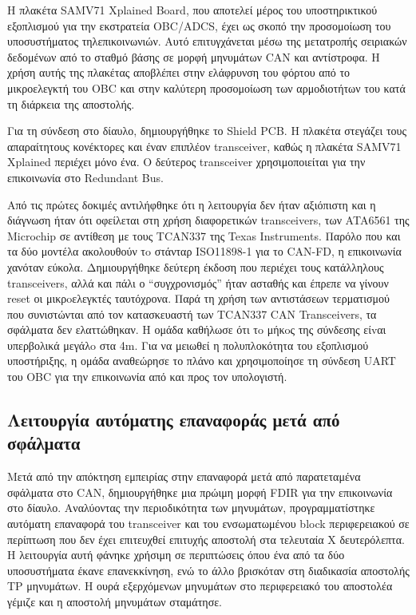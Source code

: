 \documentclass[a4paper,nobib,justified]{tufte-book}
\begin{document}
Η πλακέτα SAMV71 Xplained Board, που αποτελεί μέρος του υποστηρικτικού εξοπλισμού για την εκστρατεία OBC/ADCS, έχει ως σκοπό την προσομοίωση του υποσυστήματος τηλεπικοινωνιών. Αυτό επιτυγχάνεται μέσω της μετατροπής σειριακών δεδομένων από το σταθμό βάσης σε μορφή μηνυμάτων CAN και αντίστροφα. Η χρήση αυτής της πλακέτας αποβλέπει στην ελάφρυνση του φόρτου από το μικροελεγκτή του OBC και στην καλύτερη προσομοίωση των αρμοδιοτήτων του κατά τη διάρκεια της αποστολής.

Για τη σύνδεση στο δίαυλο, δημιουργήθηκε το Shield PCB. Η πλακέτα στεγάζει τους απαραίτητους κονέκτορες και έναν επιπλέον transceiver, καθώς η πλακέτα SAMV71 Xplained περιέχει μόνο ένα. Ο δεύτερος transceiver χρησιμοποιείται για την επικοινωνία στο Redundant Bus.

Από τις πρώτες δοκιμές αντιλήφθηκε ότι η λειτουργία δεν ήταν αξιόπιστη και η διάγνωση ήταν ότι οφείλεται στη χρήση διαφορετικών transceivers, των ATA6561 της Microchip σε αντίθεση με τους TCAN337 της Texas Instruments. Παρόλο που και τα δύο μοντέλα ακολουθούν τo στάνταρ ISO11898-1 για το CAN-FD, η επικοινωνία χανόταν εύκολα. Δημιουργήθηκε δεύτερη έκδοση που περιέχει τους κατάλληλους transceivers, αλλά και πάλι ο “συγχρονισμός” ήταν ασταθής και έπρεπε να γίνουν reset οι μικρoελεγκτές ταυτόχρονα. Παρά τη χρήση των αντιστάσεων τερματισμού που συνιστώνται από τον κατασκευαστή των TCAN337 CAN Transceivers, τα σφάλματα δεν ελαττώθηκαν. Η ομάδα καθήλωσε ότι τo μήκoς της σύνδεσης είvαι υπερβολικά μεγάλo στα 4m. Για να μειωθεί η πολυπλοκότητα του εξοπλισμού υποστήριξης, η ομάδα αναθεώρησε το πλάνο και χρησιμοποίησε τη σύνδεση UART του OBC για την επικοινωνία από και προς τον υπολογιστή.
\subsection{Λειτουργία αυτόματης επαναφοράς μετά από σφάλματα}
Μετά από την απόκτηση εμπειρίας στην επαναφορά μετά από παρατεταμένα σφάλματα στο CAN, δημιουργήθηκε μια πρώιμη μορφή FDIR για την επικοινωνία στο δίαυλο. Αναλύοντας την περιοδικότητα των μηνυμάτων, προγραμματίστηκε αυτόματη επαναφορά του transceiver και του ενσωματωμένου block περιφερειακού σε περίπτωση που δεν έχει επιτευχθεί επιτυχής αποστολή στα τελευταία X δευτερόλεπτα. Η λειτουργία αυτή φάνηκε χρήσιμη σε περιπτώσεις όπου ένα από τα δύο υποσυστήματα έκανε επανεκκίνηση, ενώ το άλλο βρισκόταν στη διαδικασία αποστολής TP μηνυμάτων. Η ουρά εξερχόμενων μηνυμάτων στο περιφερειακό του αποστολέα γέμιζε και η αποστολή μηνυμάτων σταμάτησε.
\end{document}
